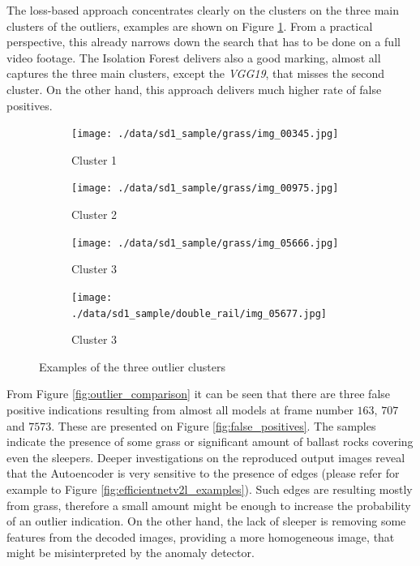 The loss-based approach concentrates clearly on the clusters on the three main clusters of the
outliers, examples are shown on Figure \ref{fig:outlier_cluster_exampels}.
From a practical perspective, this already narrows down the search that has to be done on a full
video footage.
The Isolation Forest delivers also a good marking, almost all captures the three main clusters,
except the \emph{VGG19}, that misses the second cluster.
On the other hand, this approach delivers much higher rate of false positives.

\begin{figure}[!ht]
    \centering
    \begin{subfigure}{0.48\textwidth}
        \centering
        \texttt{[image: ./data/sd1\_sample/grass/img\_00345.jpg]}
        \caption*{Cluster 1}
    \end{subfigure}
    \begin{subfigure}{0.48\textwidth}
        \centering
        \texttt{[image: ./data/sd1\_sample/grass/img\_00975.jpg]}
        \caption*{Cluster 2}
    \end{subfigure}
    \begin{subfigure}{0.48\textwidth}
        \centering
        \texttt{[image: ./data/sd1\_sample/grass/img\_05666.jpg]}
        \caption*{Cluster 3}
    \end{subfigure}
    \begin{subfigure}{0.48\textwidth}
        \centering
        \texttt{[image: ./data/sd1\_sample/double\_rail/img\_05677.jpg]}
        \caption*{Cluster 3}
    \end{subfigure}
    \caption{Examples of the three outlier clusters}
    \label{fig:outlier_cluster_exampels}
\end{figure}

From Figure \ref{fig:outlier_comparison} it can be seen that there are three false positive
indications resulting from almost all models at frame number $163$, $707$ and $7573$.
These are presented on Figure \ref{fig:false_positives}.
The samples indicate the presence of some grass or significant amount of ballast rocks
covering even the sleepers.
Deeper investigations on the reproduced output images reveal that the Autoencoder is
very sensitive to the presence of edges (please refer for example to Figure
\ref{fig:efficientnetv2l_examples}).
Such edges are resulting mostly from grass, therefore a small amount might be enough
to increase the probability of an outlier indication.
On the other hand, the lack of sleeper is removing some features from the decoded images,
providing a more homogeneous image, that might be misinterpreted by the anomaly detector.

